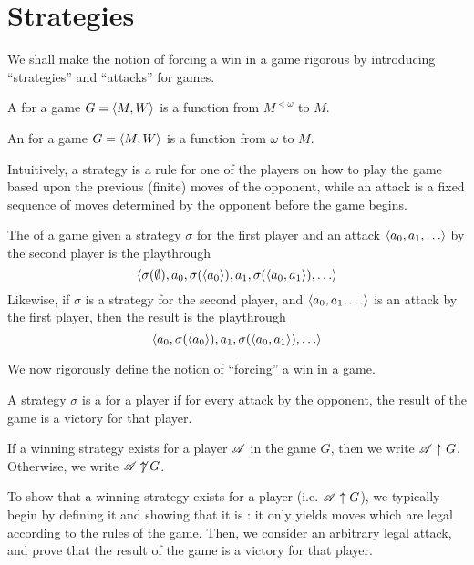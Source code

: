 \section{Strategies}

We shall make the notion of forcing a win in a game rigorous by introducing
``strategies'' and ``attacks'' for games.

\begin{defn}
  A  for a game $G=\langle M,W\rangle$ is a function
  from $M^{<\omega}$ to $M$.
\end{defn}

\begin{defn}
  An  for a game $G=\langle M,W\rangle$ is a function
  from $\omega$ to $M$.
\end{defn}

Intuitively, a strategy is a rule for one of the players on how to play
the game based upon the previous (finite) moves of the opponent, while an
attack is a fixed sequence of moves determined by the opponent before
the game begins.


\begin{defn}
  The  of a game given a strategy $\sigma$ for the first player
  and an attack $\<a_0,a_1,\dots\>$ by the second player is the playthrough
    \[
      \<
        \sigma(\emptyset),
        a_0,
        \sigma(\<a_0\>),
        a_1,
        \sigma(\<a_0,a_1\>),
        \dots
      \>
    \]
  Likewise, if $\sigma$ is a strategy for the second player, and
  $\<a_0,a_1,\dots\>$ is an attack by the first player, then the result is
  the playthrough
    \[
      \<
        a_0,
        \sigma(\<a_0\>),
        a_1,
        \sigma(\<a_0,a_1\>),
        \dots
      \>
    \]
\end{defn}

We now rigorously define the notion of ``forcing'' a win in a game.

\begin{defn}
  A strategy $\sigma$ is a  for a player if for
  every attack by the opponent, the result of the game is a victory
  for that player.

  If a winning strategy exists for a player $\mathscr{A}$ in the game $G$, then we
  write $\mathscr{A} \uparrow G$. Otherwise, we write $\mathscr{A} \not\uparrow G$.
\end{defn}

To show that a winning strategy exists for a player (i.e. $\mathscr{A}\uparrow G$),
we typically begin by
defining it and showing that it is : it only yields moves which are
legal according to the rules of the game. Then, we consider an arbitrary
legal attack, and prove that the result of the game is a victory for that
player.

